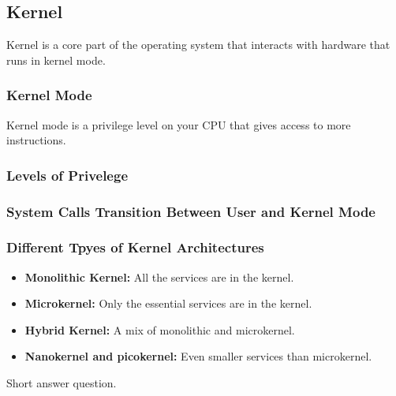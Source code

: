 \subsection{Kernel}
\begin{definition}
    Kernel is a core part of the operating system that interacts with hardware that runs in kernel mode. 
\end{definition}

\subsubsection{Kernel Mode}
\begin{definition}
    Kernel mode is a privilege level on your CPU that gives access to more instructions.
\end{definition}

\subsubsection{Levels of Privelege}
\begin{definition}
\end{definition}

\subsubsection{System Calls Transition Between User and Kernel Mode}
\begin{definition}
\end{definition}

\subsubsection{Different Tpyes of Kernel Architectures}
\begin{definition}
    \begin{itemize}
        \item \textbf{Monolithic Kernel:} All the services are in the kernel.
        \item \textbf{Microkernel:} Only the essential services are in the kernel.
        \item \textbf{Hybrid Kernel:} A mix of monolithic and microkernel.
        \item \textbf{Nanokernel and picokernel:} Even smaller services than microkernel.
    \end{itemize}
\end{definition}

\begin{warning}
    Short answer question.
\end{warning}